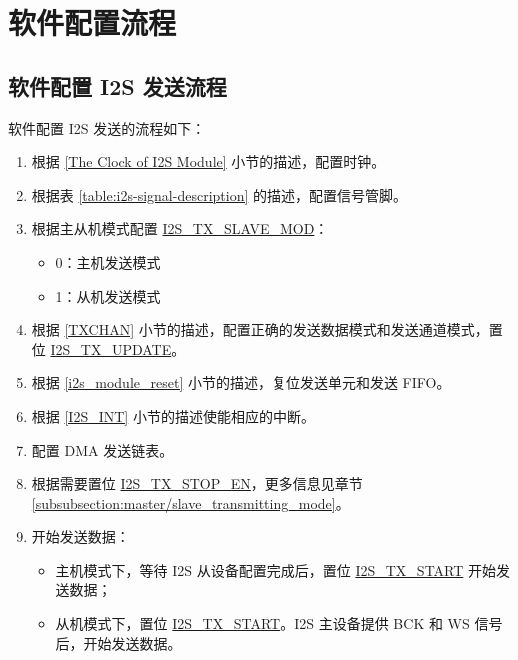 \documentclass[main\_\_CN.tex]{subfiles}
\begin{document}
\section{软件配置流程}
\subsection{软件配置 I2S 发送流程}\label{sec:configure-i2s-as-tx-mode}
软件配置 I2S 发送的流程如下：

\begin{enumerate}
    \item 根据 \ref{The Clock of I2S Module} 小节的描述，配置时钟。

    \item 根据表 \ref{table:i2s-signal-description} 的描述，配置信号管脚。

    \item 根据主从机模式配置 \hyperref[fielddesc:I2STXSLAVEMOD]{I2S\_TX\_SLAVE\_MOD}：
    \begin{itemize}
        \item 0：主机发送模式
        \item 1：从机发送模式
    \end{itemize}

    \item 根据 \ref{TXCHAN} 小节的描述，配置正确的发送数据模式和发送通道模式，置位 \hyperref[fielddesc:I2STXUPDATE]{I2S\_TX\_UPDATE}。

    \item 根据 \ref{i2s_module_reset} 小节的描述，复位发送单元和发送 FIFO。
    \item 根据 \ref{I2S_INT} 小节的描述使能相应的中断。\label{I2S-TX-INTERRUPT}

    \item 配置 DMA 发送链表。

    \item 根据需要置位 \hyperref[fielddesc:I2STXSTOPEN]{I2S\_TX\_STOP\_EN}，更多信息见章节 \ref{subsubsection:master/slave_transmitting_mode}。

    \item 开始发送数据：
    \begin{itemize}
        \item 主机模式下，等待 I2S 从设备配置完成后，置位 \hyperref[fielddesc:I2STXSTART]{I2S\_TX\_START} 开始发送数据；
        \item 从机模式下，置位 \hyperref[fielddesc:I2STXSTART]{I2S\_TX\_START}。I2S 主设备提供 BCK 和 WS 信号后，开始发送数据。
    \end{itemize}


\end{enumerate}
\end{document}
